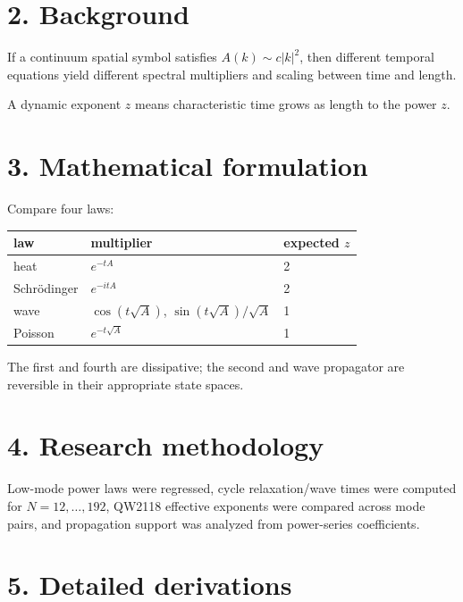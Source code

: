 \documentclass[11pt,a4paper,openany]{report}
\begin{document}
\section{2. Background}

If a continuum spatial symbol satisfies \(A(k)\sim c|k|^2\), then different temporal equations yield different spectral multipliers and scaling between time and length.

A dynamic exponent \(z\) means characteristic time grows as length to the power \(z\).

\section{3. Mathematical formulation}

Compare four laws:

\begin{center}
\begingroup\small
\setlength{\tabcolsep}{3.5pt}
\renewcommand{\arraystretch}{1.16}
\begin{longtable}{@{}p{}p{}p{}@{}}
\toprule
\textbf{law} & \textbf{multiplier} & \textbf{expected \(z\)} \\
\midrule
\endhead
heat & \(e^{-tA}\) & 2 \\
Schrödinger & \(e^{-itA}\) & 2 \\
wave & \(\cos(t\sqrt A)\), \(\sin(t\sqrt A)/\sqrt A\) & 1 \\
Poisson & \(e^{-t\sqrt A}\) & 1 \\
\bottomrule
\end{longtable}
\endgroup
\end{center}

The first and fourth are dissipative; the second and wave propagator are reversible in their appropriate state spaces.

\section{4. Research methodology}

Low-mode power laws were regressed, cycle relaxation/\allowbreak{}wave times were computed for \(N=12,\ldots,192\), QW2118 effective exponents were compared across mode pairs, and propagation support was analyzed from power-series coefficients.

\section{5. Detailed derivations}
\end{document}

